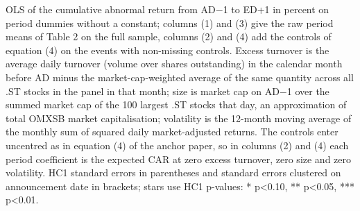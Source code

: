 \begin{threeparttable}
\begin{minipage}{\linewidth}
OLS of the cumulative abnormal return from AD$-$1 to ED+1 in percent on period dummies without a constant; columns (1) and (3) give the raw period means of Table 2 on the full sample, columns (2) and (4) add the controls of equation (4) on the events with non-missing controls. Excess turnover is the average daily turnover (volume over shares outstanding) in the calendar month before AD minus the market-cap-weighted average of the same quantity across all .ST stocks in the panel in that month; size is market cap on AD$-$1 over the summed market cap of the 100 largest .ST stocks that day, an approximation of total OMXSB market capitalisation; volatility is the 12-month moving average of the monthly sum of squared daily market-adjusted returns. The controls enter uncentred as in equation (4) of the anchor paper, so in columns (2) and (4) each period coefficient is the expected CAR at zero excess turnover, zero size and zero volatility. HC1 standard errors in parentheses and standard errors clustered on announcement date in brackets; stars use HC1 p-values: * p<0.10, ** p<0.05, *** p<0.01.\end{minipage}

\end{threeparttable}